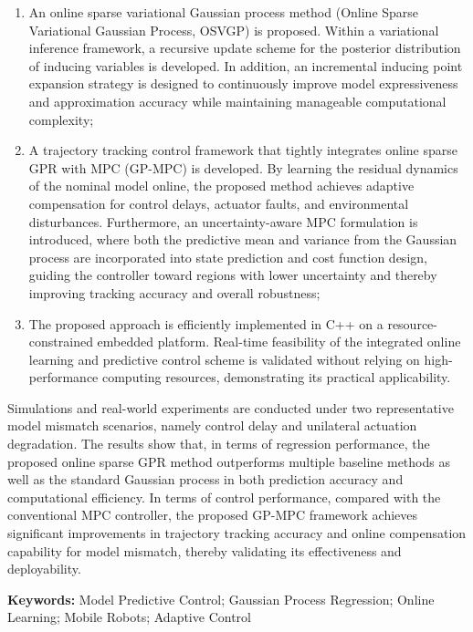 \begin{enumerate}
    \item An online sparse variational Gaussian process method (Online Sparse Variational Gaussian Process, OSVGP) is proposed. Within a 
    variational inference framework, a recursive update scheme for the posterior distribution of inducing variables is developed. 
    In addition, an incremental inducing point expansion strategy is designed to continuously improve model expressiveness and approximation 
    accuracy while maintaining manageable computational complexity;

    \item A trajectory tracking control framework that tightly integrates online sparse GPR with MPC (GP-MPC) is developed. By learning the 
    residual dynamics of the nominal model online, the proposed method achieves adaptive compensation for control delays, actuator faults, 
    and environmental disturbances. Furthermore, an uncertainty-aware MPC formulation is introduced, where both the predictive mean and 
    variance from the Gaussian process are incorporated into state prediction and cost function design, guiding the controller toward regions
     with lower uncertainty and thereby improving tracking accuracy and overall robustness;

    \item The proposed approach is efficiently implemented in C++ on a resource-constrained embedded platform. Real-time feasibility of 
    the integrated online learning and predictive control scheme is validated without relying on high-performance computing resources, 
    demonstrating its practical applicability.
\end{enumerate}

Simulations and real-world experiments are conducted under two representative model mismatch scenarios, namely control delay and unilateral 
actuation degradation. The results show that, in terms of regression performance, the proposed online sparse GPR method outperforms multiple 
baseline methods as well as the standard Gaussian process in both prediction accuracy and computational efficiency. In terms of control 
performance, compared with the conventional MPC controller, the proposed GP-MPC framework achieves significant improvements in trajectory 
tracking accuracy and online compensation capability for model mismatch, thereby validating its effectiveness and deployability.

\textbf{Keywords:} Model Predictive Control; Gaussian Process Regression; Online Learning; Mobile Robots; Adaptive Control